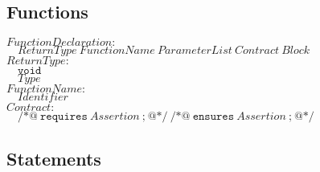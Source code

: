 \documentclass{article}
\begin{document}
\subsection{Functions}

\begin{flushleft}
$\mathit{FunctionDeclaration{:}}$\\
$\quad \mathit{ReturnType}\ \mathit{FunctionName}\ \mathit{ParameterList}\ \mathit{Contract}\ \mathit{Block}$\\[5pt]

$\mathit{ReturnType{:}}$\\
$\quad \texttt{void}$\\
$\quad \mathit{Type}$\\[5pt]

$\mathit{FunctionName{:}}$\\
$\quad \mathit{Identifier}$\\[5pt]

$\mathit{Contract{:}}$\\
$\quad \texttt{/*@}\ \texttt{requires}\ \mathit{Assertion}\ \texttt{;}\ \texttt{@*/}\ \texttt{/*@}\ \texttt{ensures}\ \mathit{Assertion}\ \texttt{;}\ \texttt{@*/}$\\[5pt]
\end{flushleft}

\subsection{Statements}
\end{document}
